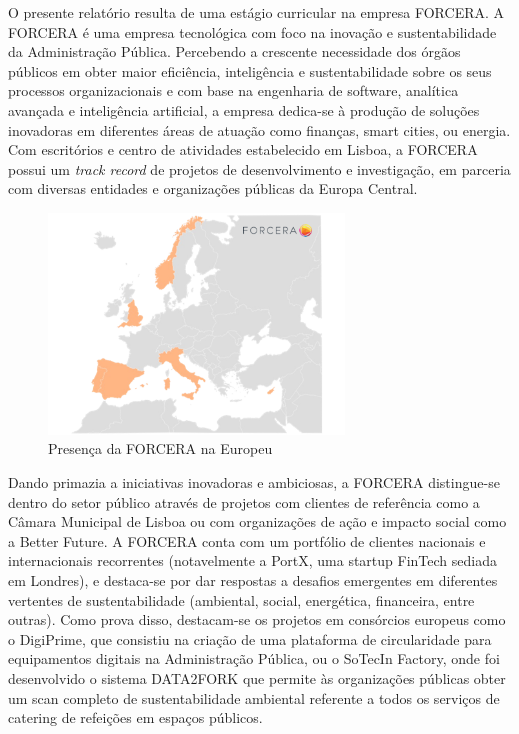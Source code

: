 O presente relatório resulta de uma estágio curricular na empresa FORCERA. A FORCERA é uma empresa tecnológica com foco na inovação e sustentabilidade da Administração Pública. Percebendo a crescente necessidade dos órgãos públicos em obter maior eficiência, inteligência e sustentabilidade sobre os seus processos organizacionais e com base na engenharia de software, analítica avançada e inteligência artificial, a empresa dedica-se à produção de soluções inovadoras em diferentes áreas de atuação como finanças, smart cities, ou energia. 
Com escritórios e centro de atividades estabelecido em Lisboa, a FORCERA possui um \textit{track record} de projetos de desenvolvimento e investigação, em parceria com diversas entidades e organizações públicas da Europa Central.

\begin{figure}[H]
	\centering
	\includegraphics[width=0.7\textwidth]{imagens/forcera.png}
	\caption{Presença da FORCERA na Europeu}
	\label{fig:forcera}
\end{figure}


Dando primazia a iniciativas inovadoras e ambiciosas, a FORCERA distingue-se dentro do setor público através de projetos com clientes de referência como a Câmara Municipal de Lisboa ou com organizações de ação e impacto social como a Better Future. A FORCERA conta com um portfólio de clientes nacionais e internacionais recorrentes (notavelmente a PortX, uma startup FinTech sediada em Londres), e destaca-se por dar respostas a desafios emergentes em diferentes vertentes de sustentabilidade (ambiental, social, energética, financeira, entre outras). Como prova disso, destacam-se os projetos em consórcios europeus como o DigiPrime, que consistiu na criação de uma plataforma de circularidade para equipamentos digitais na Administração Pública, ou o SoTecIn Factory, onde foi desenvolvido o sistema DATA2FORK que permite às organizações públicas obter um scan completo de sustentabilidade ambiental referente a todos os serviços de catering de refeições em espaços públicos.

